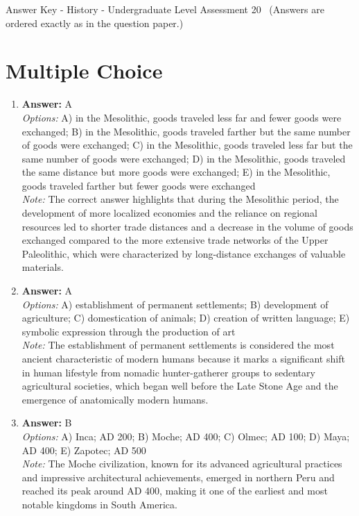 \documentclass[12pt]{article}
\begin{document}
\begin{center}
Answer Key - History - Undergraduate Level Assessment 20 \
\small (Answers are ordered exactly as in the question paper.)
\end{center}

\section*{Multiple Choice}
\begin{enumerate}[label=\arabic*.]
\item \textbf{Answer:} A
\\ \textit{Options:} A) in the Mesolithic, goods traveled less far and fewer goods were exchanged; B) in the Mesolithic, goods traveled farther but the same number of goods were exchanged; C) in the Mesolithic, goods traveled less far but the same number of goods were exchanged; D) in the Mesolithic, goods traveled the same distance but more goods were exchanged; E) in the Mesolithic, goods traveled farther but fewer goods were exchanged
\\ \textit{Note:} The correct answer highlights that during the Mesolithic period, the development of more localized economies and the reliance on regional resources led to shorter trade distances and a decrease in the volume of goods exchanged compared to the more extensive trade networks of the Upper Paleolithic, which were characterized by long-distance exchanges of valuable materials.
\item \textbf{Answer:} A
\\ \textit{Options:} A) establishment of permanent settlements; B) development of agriculture; C) domestication of animals; D) creation of written language; E) symbolic expression through the production of art
\\ \textit{Note:} The establishment of permanent settlements is considered the most ancient characteristic of modern humans because it marks a significant shift in human lifestyle from nomadic hunter-gatherer groups to sedentary agricultural societies, which began well before the Late Stone Age and the emergence of anatomically modern humans.
\item \textbf{Answer:} B
\\ \textit{Options:} A) Inca; AD 200; B) Moche; AD 400; C) Olmec; AD 100; D) Maya; AD 400; E) Zapotec; AD 500
\\ \textit{Note:} The Moche civilization, known for its advanced agricultural practices and impressive architectural achievements, emerged in northern Peru and reached its peak around AD 400, making it one of the earliest and most notable kingdoms in South America.

\end{enumerate}
\end{document}
